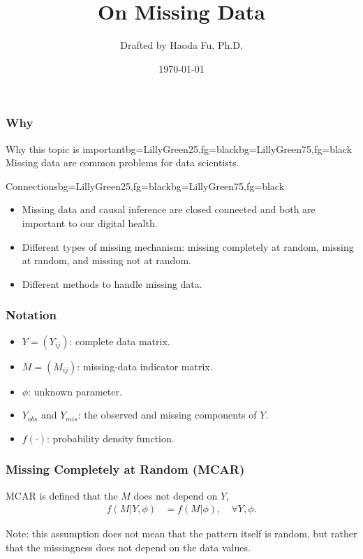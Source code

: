 \documentclass[notes=no]{beamer}
\title{On Missing Data}    %
\author{Drafted by Haoda Fu, Ph.D.}                 %
\institute{Statistics for Data Scientists Series}      %
\date{\today}
\begin{document}
\begin{frame}
	\titlepage
\end{frame}


\begin{frame}
	\frametitle{Why}
		\begin{variableblock}{Why this topic is important}{bg=LillyGreen25,fg=black}{bg=LillyGreen75,fg=black}
			Missing data are common problems for data scientists.
		\end{variableblock}
	\pause
		\begin{variableblock}{Connections}{bg=LillyGreen25,fg=black}{bg=LillyGreen75,fg=black}
			\begin{itemize}
				\item Missing data and causal inference are closed connected and both are important to our digital health.
				\item Different types of missing mechanism: missing completely at random, missing at random, and missing not at random.
				\item Different methods to handle missing data.
				\end{itemize}	
	\end{variableblock}
\end{frame}

\begin{frame}
	\frametitle{Notation}
	\begin{itemize}
		\item $Y=(Y_{ij})$:  complete data matrix.
		\item $M=(M_{ij})$: missing-data indicator matrix.
		\item $\phi$: unknown parameter.
		\item $Y_{obs}$ and $Y_{mis}$: the observed and missing components of $Y$.
		\item  $f(\cdot)$: probability density function.
	\end{itemize}
\end{frame}

\begin{frame}
	\frametitle{Missing Completely at Random (MCAR)}
	
	\begin{definition}[MCAR]
		MCAR is defined that the $M$ does not depend on $Y$,
		\begin{align*}
		f(M | Y, \phi) &= f(M|\phi), \quad \forall Y, \phi.
		\end{align*}
     \end{definition}
 		Note:  this assumption does not mean that the pattern itself is random, but rather that the missingness does not depend on the data values. 
\end{frame}
\end{document}
